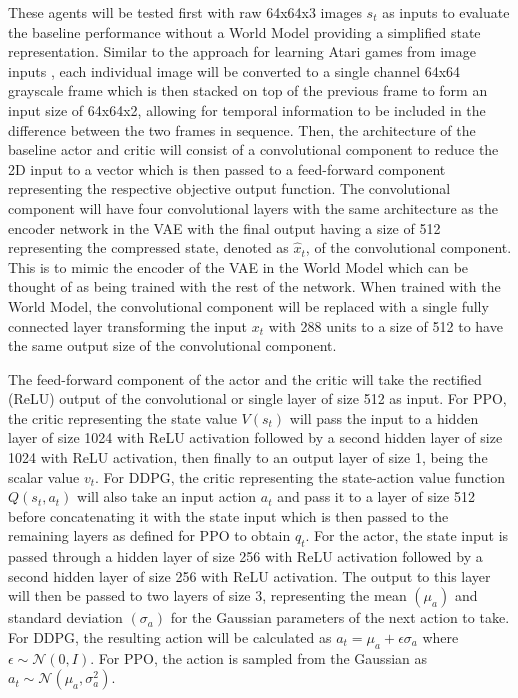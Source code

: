 These agents will be tested first with raw 64x64x3 images $s_t$ as inputs to evaluate the baseline performance without a World Model providing a simplified state representation. Similar to the approach for learning Atari games from image inputs \cite{2.1.1}, each individual image will be converted to a single channel 64x64 grayscale frame which is then stacked on top of the previous frame to form an input size of 64x64x2, allowing for temporal information to be included in the difference between the two frames in sequence. Then, the architecture of the baseline actor and critic will consist of a convolutional component to reduce the 2D input to a vector which is then passed to a feed-forward component representing the respective objective output function. The convolutional component will have four convolutional layers with the same architecture as the encoder network in the VAE with the final output having a size of 512 representing the compressed state, denoted as $\hat{x}_t$, of the convolutional component. This is to mimic the encoder of the VAE in the World Model which can be thought of as being trained with the rest of the network. When trained with the World Model, the convolutional component will be replaced with a single fully connected layer transforming the input $x_t$ with 288 units to a size of 512 to have the same output size of the convolutional component.

The feed-forward component of the actor and the critic will take the rectified (ReLU) output of the convolutional or single layer of size 512 as input. For PPO, the critic representing the state value $V(s_t)$ will pass the input to a hidden layer of size 1024 with ReLU activation followed by a second hidden layer of size 1024 with ReLU activation, then finally to an output layer of size 1, being the scalar value $v_t$. For DDPG, the critic representing the state-action value function $Q(s_t,a_t)$ will also take an input action $a_t$ and pass it to a layer of size 512 before concatenating it with the state input which is then passed to the remaining layers as defined for PPO to obtain $q_t$. For the actor, the state input is passed through a hidden layer of size 256 with ReLU activation followed by a second hidden layer of size 256 with ReLU activation. The output to this layer will then be passed to two layers of size 3, representing the mean $(\mu_a)$ and standard deviation $(\sigma_a)$ for the Gaussian parameters of the next action to take. For DDPG, the resulting action will be calculated as $a_t = \mu_a + \epsilon \sigma_a$ where $\epsilon \sim \mathcal{N}(0,I)$. For PPO, the action is sampled from the Gaussian as $a_t \sim \mathcal{N}(\mu_a,\sigma_a^2)$.


